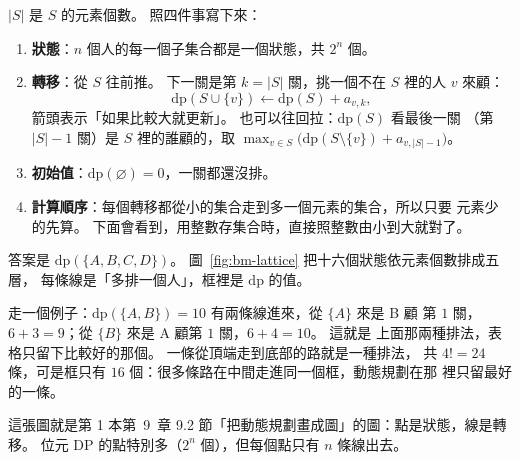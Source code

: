 $|S|$ 是 $S$ 的元素個數。 照四件事寫下來：

\begin{enumerate}
\item \textbf{狀態}：$n$ 個人的每一個子集合都是一個狀態，共 $2^n$ 個。
\item \textbf{轉移}：從 $S$ 往前推。 下一關是第 $k = |S|$ 關，挑一個不在 $S$
裡的人 $v$ 來顧：
\[
\mathrm{dp}(S \cup \{v\}) \leftarrow \mathrm{dp}(S) + a_{v,k},
\]
箭頭表示「如果比較大就更新」。 也可以往回拉：$\mathrm{dp}(S)$ 看最後一關
（第 $|S| - 1$ 關）是 $S$ 裡的誰顧的，取
$\max_{v \in S} \bigl(\mathrm{dp}(S \setminus \{v\}) + a_{v,|S|-1}\bigr)$。
\item \textbf{初始值}：$\mathrm{dp}(\varnothing) = 0$，一關都還沒排。
\item \textbf{計算順序}：每個轉移都從小的集合走到多一個元素的集合，所以只要
元素少的先算。 下面會看到，用整數存集合時，直接照整數由小到大就對了。
\end{enumerate}

答案是 $\mathrm{dp}(\{A, B, C, D\})$。 圖~\ref{fig:bm-lattice} 把十六個狀態依元素個數排成五層，
每條線是「多排一個人」，框裡是 $\mathrm{dp}$ 的值。


走一個例子：$\mathrm{dp}(\{A, B\}) = 10$ 有兩條線進來，從 $\{A\}$ 來是 B 顧
第 $1$ 關，$6 + 3 = 9$；從 $\{B\}$ 來是 A 顧第 $1$ 關，$6 + 4 = 10$。 這就是
上面那兩種排法，表格只留下比較好的那個。 一條從頂端走到底部的路就是一種排法，
共 $4! = 24$ 條，可是框只有 $16$ 個：很多條路在中間走進同一個框，動態規劃在那
裡只留最好的一條。

這張圖就是第 1 本第~9~章 9.2 節「把動態規劃畫成圖」的圖：點是狀態，線是轉移。
位元 DP 的點特別多（$2^n$ 個），但每個點只有 $n$ 條線出去。

